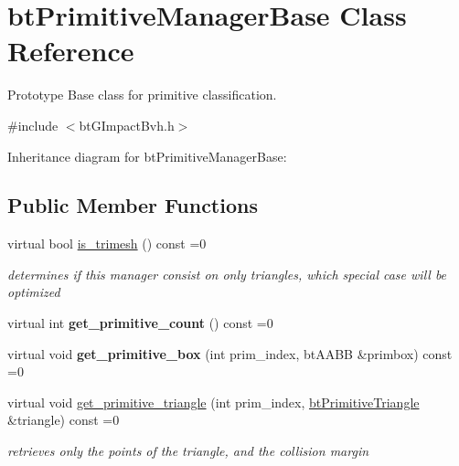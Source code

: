\hypertarget{classbt_primitive_manager_base}{\section{bt\+Primitive\+Manager\+Base Class Reference}
\label{classbt_primitive_manager_base}
}


Prototype Base class for primitive classification.  




{\ttfamily \#include $<$bt\+G\+Impact\+Bvh.\+h$>$}



Inheritance diagram for bt\+Primitive\+Manager\+Base\+:
\subsection*{Public Member Functions}
\begin{DoxyCompactItemize}
\item 
\hypertarget{classbt_primitive_manager_base_a7dce7dd350286219d9adddefa20394f9}{virtual bool \hyperlink{classbt_primitive_manager_base_a7dce7dd350286219d9adddefa20394f9}{is\+\_\+trimesh} () const =0}\label{classbt_primitive_manager_base_a7dce7dd350286219d9adddefa20394f9}

\begin{DoxyCompactList}\small\item\em determines if this manager consist on only triangles, which special case will be optimized \end{DoxyCompactList}\item 
\hypertarget{classbt_primitive_manager_base_a9799cc93c1cf51471d22c5295f276ae8}{virtual int {\bfseries get\+\_\+primitive\+\_\+count} () const =0}\label{classbt_primitive_manager_base_a9799cc93c1cf51471d22c5295f276ae8}

\item 
\hypertarget{classbt_primitive_manager_base_ac826409d978724f266d4e3453118de4e}{virtual void {\bfseries get\+\_\+primitive\+\_\+box} (int prim\+\_\+index, bt\+A\+A\+B\+B \&primbox) const =0}\label{classbt_primitive_manager_base_ac826409d978724f266d4e3453118de4e}

\item 
\hypertarget{classbt_primitive_manager_base_a2eb95b960e4259da38c5ee4ac080fdf7}{virtual void \hyperlink{classbt_primitive_manager_base_a2eb95b960e4259da38c5ee4ac080fdf7}{get\+\_\+primitive\+\_\+triangle} (int prim\+\_\+index, \hyperlink{classbt_primitive_triangle}{bt\+Primitive\+Triangle} \&triangle) const =0}\label{classbt_primitive_manager_base_a2eb95b960e4259da38c5ee4ac080fdf7}

\begin{DoxyCompactList}\small\item\em retrieves only the points of the triangle, and the collision margin \end{DoxyCompactList}\end{DoxyCompactItemize}


